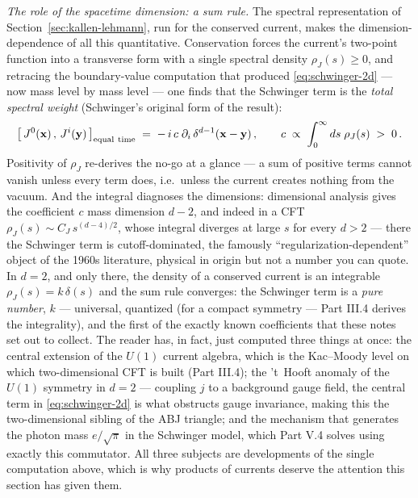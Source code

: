 \begin{eexample}
\emph{The role of the spacetime dimension: a sum rule.} The spectral representation
of Section~\ref{sec:kallen-lehmann}, run for the conserved current, makes the
dimension-dependence of all this quantitative. Conservation forces the
current's two-point function into a transverse form with a single spectral
density $\rho_J(s) \ge 0$, and retracing the boundary-value computation that
produced \eqref{eq:schwinger-2d} --- now mass level by mass level --- one
finds that the Schwinger term is the \emph{total spectral weight}
(Schwinger's original form of the result):
\begin{equation}
\big[\,J^0(\mathbf{x})\,,\,J^i(\mathbf{y})\,\big]_{\rm equal\ time}
\;=\; -\,i\,c\;\partial_i\,\delta^{d-1}(\mathbf{x} - \mathbf{y})\,,
\qquad
c \;\propto\; \int_0^\infty ds\;\rho_J(s) \;>\;0\,.
\label{eq:schwinger-sum-rule}
\end{equation}
Positivity of $\rho_J$ re-derives the no-go at a glance --- a sum of positive
terms cannot vanish unless every term does, i.e.\ unless the current creates
nothing from the vacuum. And the integral diagnoses the dimensions:
dimensional analysis gives the coefficient $c$ mass dimension $d-2$, and
indeed in a CFT $\rho_J(s) \sim C_J\, s^{(d-4)/2}$, whose integral diverges
at large $s$ for every $d > 2$ --- there the Schwinger term is
cutoff-dominated, the famously ``regularization-dependent'' object of the
1960s literature, physical in origin but not a number you can quote. In
$d = 2$, and only there, the density of a conserved current is an integrable
$\rho_J(s) = k\,\delta(s)$ and the sum rule converges: the Schwinger term is
a \emph{pure number}, $k$ --- universal, quantized (for a compact symmetry
--- Part III.4 derives the integrality), and the first of the exactly known
coefficients that these notes set out to collect. The reader has, in fact,
just computed three things at once: the central extension of the $U(1)$
current algebra, which is the Kac--Moody level on which two-dimensional CFT
is built (Part III.4); the 't~Hooft anomaly of the $U(1)$ symmetry in $d =
2$ --- coupling $j$ to a background gauge field, the central term in
\eqref{eq:schwinger-2d} is what obstructs gauge invariance, making this the
two-dimensional sibling of the ABJ triangle; and the mechanism that
generates the photon mass $e/\sqrt\pi$ in the Schwinger model, which Part
V.4 solves using exactly this commutator. All three subjects are
developments of the single computation above, which is why products of
currents deserve the attention this section has given them.
\end{eexample}

